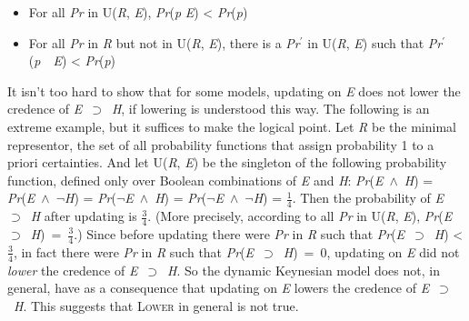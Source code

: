 \begin{itemize}
\item For all \textit{Pr} in U(\textit{R}, \textit{E}), \textit{Pr}(\textit{p} {\textbar} \textit{E}) {\textless} \textit{Pr}(\textit{p})
\item For all \textit{Pr} in \textit{R} but not in U(\textit{R}, \textit{E}), there is a \textit{Pr}\(^\prime\) in U(\textit{R}, \textit{E}) such that \textit{Pr}\(^\prime\)(\textit{p}~{\textbar}~\textit{E}) {\textless} \textit{Pr}(\textit{p})
\end{itemize}

\noindent It isn't too hard to show that for some models, updating on \textit{E} does not lower the credence of \textit{E}~${\supset}$~\textit{H}, if lowering is understood this way. The following is an extreme example, but it suffices to make the logical point. Let \textit{R} be the minimal representor, the set of all probability functions that assign probability 1 to a priori certainties. And let U(\textit{R}, \textit{E}) be the singleton of the following probability function, defined only over Boolean combinations of \textit{E} and \textit{H}: \textit{Pr}(\textit{E}~${\wedge}$~\textit{H}) = \textit{Pr}(\textit{E}~${\wedge}$~${\lnot}$\textit{H}) = \textit{Pr}(${\lnot}$\textit{E}~${\wedge}$~\textit{H}) = \textit{Pr}(${\lnot}$\textit{E}~${\wedge}$~${\lnot}$\textit{H}) = \(\frac{1}{4}\). Then the probability of \textit{E}~${\supset}$~\textit{H} after updating is \(\frac{3}{4}\). (More precisely, according to all \textit{Pr} in U(\textit{R}, \textit{E}), \textit{Pr}(\textit{E}~${\supset}$~\textit{H})~=~\(\frac{3}{4}\).) Since before updating there were \textit{Pr} in \textit{R} such that \textit{Pr}(\textit{E}~${\supset}$~\textit{H}) {\textless}  \(\frac{3}{4}\), in fact there were \textit{Pr} in \textit{R} such that \textit{Pr}(\textit{E}~${\supset}$~\textit{H})~=~0, updating on \textit{E} did not \textit{lower} the credence of \textit{E}~${\supset}$~\textit{H}. So the dynamic Keynesian model does not, in general, have as a consequence that updating on \textit{E} lowers the credence of \textit{E}~${\supset}$~\textit{H}. This suggests that \textsc{Lower} in general is not true.

